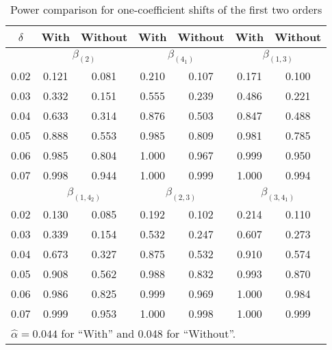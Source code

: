 \begin{table}[!ht]
\tabcolsep 7.5pt \vspace{-0.1cm} \centering \caption{Power comparison for
one-coefficient shifts of the first two orders} \vspace{0.3cm}
\renewcommand{\arraystretch}{1.25}
\begin{tabular}{c|cc|cc|cc}\hline
$\delta$ & With & Without & With & Without & With & Without
\\\hline
& \multicolumn{2}{c|}{$\beta_{(2)}$} & \multicolumn{2}{c|}{$\beta_{(4_1)}$} &
\multicolumn{2}{c}{$\beta_{(1,3)}$}
\\\hline
0.02 & 0.121 & 0.081 & 0.210 & 0.107 & 0.171 & 0.100 \\
0.03 & 0.332 & 0.151 & 0.555 & 0.239 & 0.486 & 0.221 \\
0.04 & 0.633 & 0.314 & 0.876 & 0.503 & 0.847 & 0.488 \\
0.05 & 0.888 & 0.553 & 0.985 & 0.809 & 0.981 & 0.785 \\
0.06 & 0.985 & 0.804 & 1.000 & 0.967 & 0.999 & 0.950 \\
0.07 & 0.998 & 0.944 & 1.000 & 0.999 & 1.000 & 0.994
\\\hline
& \multicolumn{2}{c|}{$\beta_{(1,4_2)}$} & \multicolumn{2}{c|}{$\beta_{(2,3)}$} &
\multicolumn{2}{c}{$\beta_{(3,4_1)}$}
\\\hline
0.02 & 0.130 & 0.085 & 0.192 & 0.102 & 0.214 & 0.110 \\
0.03 & 0.339 & 0.154 & 0.532 & 0.247 & 0.607 & 0.273 \\
0.04 & 0.673 & 0.327 & 0.875 & 0.532 & 0.910 & 0.574 \\
0.05 & 0.908 & 0.562 & 0.988 & 0.832 & 0.993 & 0.870 \\
0.06 & 0.986 & 0.825 & 0.999 & 0.969 & 1.000 & 0.984 \\
0.07 & 0.999 & 0.953 & 1.000 & 0.998 & 1.000 & 0.999
\\\hline
\multicolumn{7}{l}{$\hat{\alpha}=0.044$ for ``With'' and 0.048 for ``Without''.}
\end{tabular}
\end{table}

